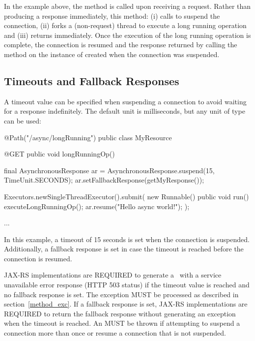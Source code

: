 In the example above, the method  is called upon receiving a  request. Rather than producing a response immediately, this method: (i) calls  to suspend the connection, (ii) forks a (non-request) thread to execute a long running operation and (iii) returns immediately. Once the execution of the long running operation is complete, the connection is resumed and the response returned by calling the method  on the instance of  created when the connection was suspended.

\subsection{Timeouts and Fallback Responses}
\label{suspend_annotation}

A timeout value can be specified when suspending a connection to avoid waiting for a response indefinitely. The default unit is milliseconds, but any unit of type  can be used:

\begin{listing}{1}
@Path("/async/longRunning")
public class MyResource {
    
    @GET
    public void longRunningOp() {
        final AsynchronousResponse ar = 
            AsynchronousResponse.suspend(15, TimeUnit.SECONDS);
        ar.setFallbackResponse(getMyResponse());

        Executors.newSingleThreadExecutor().submit(
            new Runnable() {
                public void run() {
                    executeLongRunningOp();
                    ar.resume("Hello async world!");
        } });
    } 
    ...
}
\end{listing}

In this example, a timeout of 15 seconds is set when the connection is suspended. Additionally, a fallback response is set in case the timeout is reached before the connection is resumed.

JAX-RS implementations are REQUIRED to generate a \WebApplicationException\ with a service unavailable error response (HTTP 503 status) if the timeout value is reached and no fallback response is set. The exception MUST be processed as described in section~\ref{method_exc}. If a fallback response is set, JAX-RS implementations are REQUIRED to return the fallback response without generating an exception when the timeout is reached. An  MUST be thrown if attempting to suspend a connection more than once or resume a connection that is not suspended.

